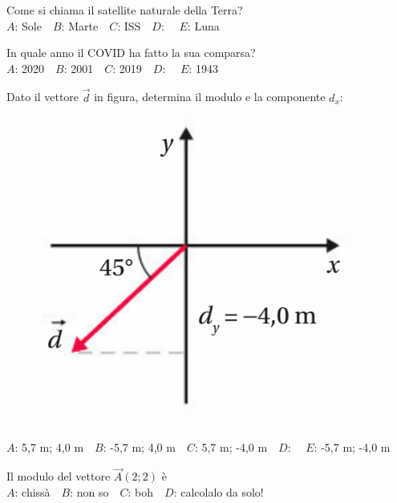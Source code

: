 \mcglobalheader
\def\mcserialnumber{10}
\mcpaperheader


\def\mcquestionnumber{1}


\mcquestionheader Come si chiama il satellite naturale della Terra?\\
{$A$}: Sole\ \ {$B$}: Marte\ \ {$C$}: ISS\ \ {$D$}: \ \ {$E$}: Luna\ \ 

\mcquestionfooter



\def\mcquestionnumber{2}


\mcquestionheader In quale anno il COVID ha fatto la sua comparsa?\\
{$A$}: 2020\ \ {$B$}: 2001\ \ {$C$}: 2019\ \ {$D$}: \ \ {$E$}: 1943\ \ 

\mcquestionfooter



\def\mcquestionnumber{3}


\mcquestionheader Dato il vettore $\vec{d}$ in figura, determina il modulo e la componente $d_x$: \begin{figure}[h!]   \begin{center}     \includegraphics[scale=0.35]{vettored.png}   \end{center} \end{figure}\\
{$A$}: 5,7 m; 4,0 m\ \ {$B$}: -5,7 m; 4,0 m\ \ {$C$}: 5,7 m; -4,0 m\ \ {$D$}: \ \ {$E$}: -5,7 m; -4,0 m\ \ 

\mcquestionfooter



\def\mcquestionnumber{4}


\mcquestionheader Il modulo del vettore $\vec{A}(2;2)$ è\\
{$A$}: chissà\ \ {$B$}: non so\ \ {$C$}: boh\ \ {$D$}: calcolalo da solo!\ \ 


